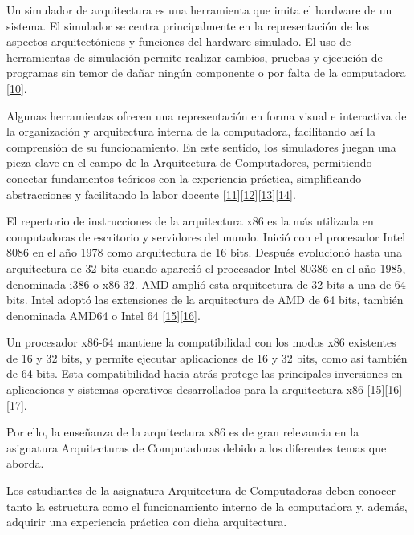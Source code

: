 \documentclass[12pt,twoside]{templates/unerthesis}
\begin{document}
Un simulador de arquitectura es una herramienta que imita el hardware de un sistema. El simulador se centra principalmente en la representación de los aspectos arquitectónicos y funciones del hardware simulado. El uso de herramientas de simulación permite realizar cambios, pruebas y ejecución de programas sin temor de dañar ningún componente o por falta de la computadora {[}\protect\hyperlink{ref-radivojevic_design_2011}{10}{]}.

Algunas herramientas ofrecen una representación en forma visual e interactiva de la organización y arquitectura interna de la computadora, facilitando así la comprensión de su funcionamiento. En este sentido, los simuladores juegan una pieza clave en el campo de la Arquitectura de Computadores, permitiendo conectar fundamentos teóricos con la experiencia práctica, simpliﬁcando abstracciones y facilitando la labor docente {[}\protect\hyperlink{ref-nikolic_survey_2009}{11}{]}{[}\protect\hyperlink{ref-hasan_survey_2012}{12}{]}{[}\protect\hyperlink{ref-hennessy_computer_2012}{13}{]}{[}\protect\hyperlink{ref-stallings_computer_2013}{14}{]}.

El repertorio de instrucciones de la arquitectura x86 es la más utilizada en computadoras de escritorio y servidores del mundo. Inició con el procesador Intel 8086 en el año 1978 como arquitectura de 16 bits. Después evolucionó hasta una arquitectura de 32 bits cuando apareció el procesador Intel 80386 en el año 1985, denominada i386 o x86-32. AMD amplió esta arquitectura de 32 bits a una de 64 bits. Intel adoptó las extensiones de la arquitectura de AMD de 64 bits, también denominada AMD64 o Intel 64 {[}\protect\hyperlink{ref-intel_64_2016}{15}{]}{[}\protect\hyperlink{ref-amd_developer_2019}{16}{]}.

Un procesador x86-64 mantiene la compatibilidad con los modos x86 existentes de 16 y 32 bits, y permite ejecutar aplicaciones de 16 y 32 bits, como así también de 64 bits. Esta compatibilidad hacia atrás protege las principales inversiones en aplicaciones y sistemas operativos desarrollados para la arquitectura x86 {[}\protect\hyperlink{ref-intel_64_2016}{15}{]}{[}\protect\hyperlink{ref-amd_developer_2019}{16}{]}{[}\protect\hyperlink{ref-abel_ibm_2000}{17}{]}.

Por ello, la enseñanza de la arquitectura x86 es de gran relevancia en la asignatura Arquitecturas de Computadoras debido a los diferentes temas que aborda.

Los estudiantes de la asignatura Arquitectura de Computadoras deben conocer tanto la estructura como el funcionamiento interno de la computadora y, además, adquirir una experiencia práctica con dicha arquitectura.
\end{document}
